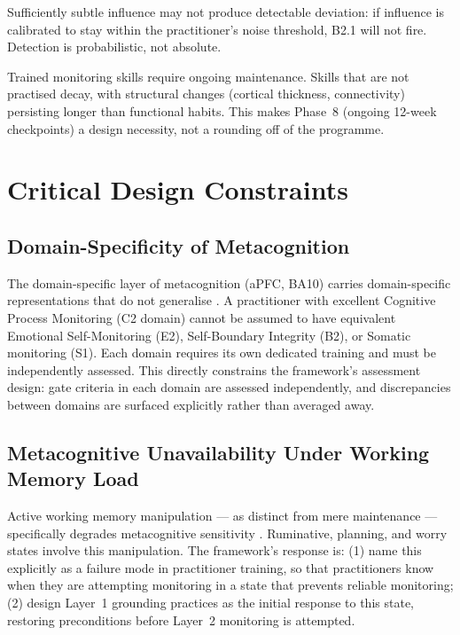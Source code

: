 \documentclass[12pt, a4paper]{article}
\begin{document}
Sufficiently subtle influence may not produce detectable deviation: if influence is
calibrated to stay within the practitioner's noise threshold, B2.1 will not fire.
Detection is probabilistic, not absolute.

Trained monitoring skills require ongoing maintenance. Skills that are not practised
decay, with structural changes (cortical thickness, connectivity) persisting longer
than functional habits. This makes Phase~8 (ongoing 12-week checkpoints) a design
necessity, not a rounding off of the programme.

\section{Critical Design Constraints}

\subsection{Domain-Specificity of Metacognition}

The domain-specific layer of metacognition (aPFC, BA10) carries domain-specific
representations that do not generalise \citep{morales2018, fleming2014}. A
practitioner with excellent Cognitive Process Monitoring (C2 domain) cannot be
assumed to have equivalent Emotional Self-Monitoring (E2), Self-Boundary Integrity
(B2), or Somatic monitoring (S1). Each domain requires its own dedicated training
and must be independently assessed. This directly constrains the framework's
assessment design: gate criteria in each domain are assessed independently, and
discrepancies between domains are surfaced explicitly rather than averaged away.

\subsection{Metacognitive Unavailability Under Working Memory Load}

Active working memory manipulation --- as distinct from mere maintenance ---
specifically degrades metacognitive sensitivity \citep{maniscalco2015}. Ruminative,
planning, and worry states involve this manipulation. The framework's response is:
(1) name this explicitly as a failure mode in practitioner training, so that
practitioners know when they are attempting monitoring in a state that prevents
reliable monitoring; (2) design Layer~1 grounding practices as the initial response
to this state, restoring preconditions before Layer~2 monitoring is attempted.
\end{document}
